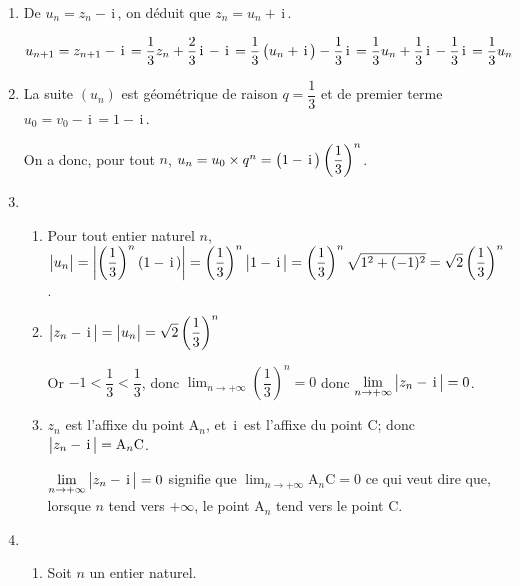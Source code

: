 \documentclass[10pt,a4paper]{article}
\renewcommand{\i}{\mathrm{\,i\,}}%
\newcommand{\ds}{\displaystyle}
\begin{document}
\begin{enumerate}
\item De $u_n=z_n-\i$, on  déduit que $z_n=u_n+\i$.


$u_{n+1}= z_{n+1} -\i = \dfrac{1}{3} z_n +\dfrac{2}{3}\i - \i 
= \dfrac{1}{3} \left ( u_n+\i \strut\right ) -\dfrac{1}{3}\i
= \dfrac{1}{3} u_n + \dfrac{1}{3}\i - \dfrac{1}{3}\i
= \dfrac{1}{3} u_n$ 

\item%
La suite $(u_n)$ est géométrique de raison $q=\dfrac{1}{3}$ et de premier terme $u_0=v_0 -\i = 1-\i$.

On a donc, pour tout $n$, $u_n=u_0\times q^n = \left (1-\i\strut\right ) \left (\dfrac{1}{3} \right )^n$.


\item 
\begin{enumerate}
\item Pour tout entier naturel $n$, \\
$\left |u_n\strut\right | = \left | \left (\dfrac{1}{3}\right )^n\left (1-\i\right )\right | = \left (\dfrac{1}{3}\right )^n \left |1-\i\strut\right |
= \left (\dfrac{1}{3}\right )^n \ds\sqrt{1^2 + (-1)^2}
= \ds\sqrt{2}\left (\dfrac{1}{3}\right )^n$.

\item %
$\left |z_n-\i \strut\right | = \left |u_n \strut\right | = \ds\sqrt{2}\left (\dfrac{1}{3}\right )^n$

Or $-1<\dfrac{1}{3} < \dfrac{1}{3}$, donc $\ds\lim_{n \to +\infty} \left (\dfrac{1}{3} \right )^n =0$ donc 
$\ds\lim_{n\to +\infty} \left |z_n-\i \strut\right |=0$.

\item%
$z_n$ est l'affixe du point A$_n$, et $\i$ est l'affixe du point C; donc $\left |z_n-\i \strut\right |=\text{A}_n\text{C}$.

$\ds\lim_{n\to +\infty} \left |z_n-\i \strut\right |=0$ signifie que $\ds\lim_{n\to +\infty} \text{A}_n\text{C}=0$ ce qui veut dire que, lorsque $n$ tend vers $+\infty$, le point A$_n$ tend vers le point C.

\end{enumerate}

\item 
\begin{enumerate}
\item Soit $n$ un entier naturel.%


\end{enumerate}
\end{enumerate}
\end{document}
